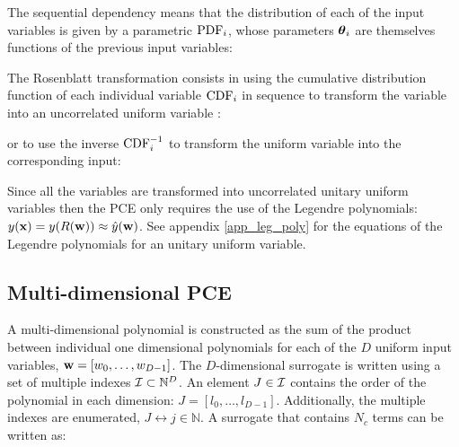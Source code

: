 \documentclass[preprint,12pt]{elsarticle}
\begin{document}
The sequential dependency means that the distribution of each of the input variables is given by a parametric $\mathrm{PDF}_i$, whose parameters $\boldsymbol{\theta}_i$ are themselves functions of the previous input variables:


The Rosenblatt transformation consists in using the cumulative distribution function of each individual variable $\mathrm{CDF}_i$ in sequence to transform the variable into an uncorrelated uniform variable \cite{rosenblatt1952}:


\noindent or to use the inverse $\mathrm{CDF}^{-1}_i$ to transform the uniform variable into the corresponding input:


Since all the variables are transformed into uncorrelated unitary uniform variables then the PCE only requires the use of the Legendre polynomials: $y(\mathbf{x}) = y(R(\mathbf{w})) \approx \hat{y}(\mathbf{w})$. See appendix \ref{app_leg_poly} for the equations of the Legendre polynomials for an unitary uniform variable.




\subsection{Multi-dimensional PCE}

A multi-dimensional polynomial is constructed as the sum of the product between individual one dimensional polynomials for each of the $D$ uniform input variables, $\mathbf{w}=[w_0,\dots,w_{D-1}]$. The $D$-dimensional surrogate is written using a set of multiple indexes $\mathcal{I} \subset \mathbb{N}^D$. An element $J\in \mathcal{I}$ contains the order of the polynomial in each dimension: $J = [l_0, \dots, l_{D-1}]$. Additionally, the multiple indexes are enumerated, $J \leftrightarrow j \in \mathbb{N}$. A surrogate that contains $N_c$ terms can be written as:
\end{document}
